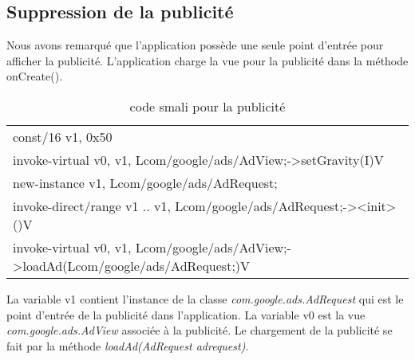 
\subsection{Suppression de la publicité}
Nous avons remarqué que l'application possède une seule point d'entrée pour afficher la publicité.
L'application charge la vue pour la publicité dans la méthode onCreate().
\begin{figure}[hp]
	      \begin{center}
	      \end{center}
\end{figure}

\begin{table}[here]
    \begin{center}
	\begin{tabular}{|l|}
	\hline
	const/16 v1, 0x50 \\[0.2cm]
	
	invoke-virtual {v0, v1}, Lcom/google/ads/AdView;->setGravity(I)V \\[0.2cm]

	new-instance v1, Lcom/google/ads/AdRequest; \\[0.2cm]

	invoke-direct/range {v1 .. v1}, Lcom/google/ads/AdRequest;-><init>()V \\[0.2cm]

	invoke-virtual {v0, v1}, Lcom/google/ads/AdView;->loadAd(Lcom/google/ads/AdRequest;)V \\
	\hline
	\end{tabular}
    \end{center}
    \caption{\label{}code smali pour la publicité}
\end{table} 
La variable v1 contient l'instance de la classe \textit{com.google.ads.AdRequest} qui est le point d'entrée de la publicité dans l'application.
La variable v0 est la vue \textit{com.google.ads.AdView} associée à la publicité. Le chargement de la publicité se fait par la méthode \textit{loadAd(AdRequest adrequest)}.
